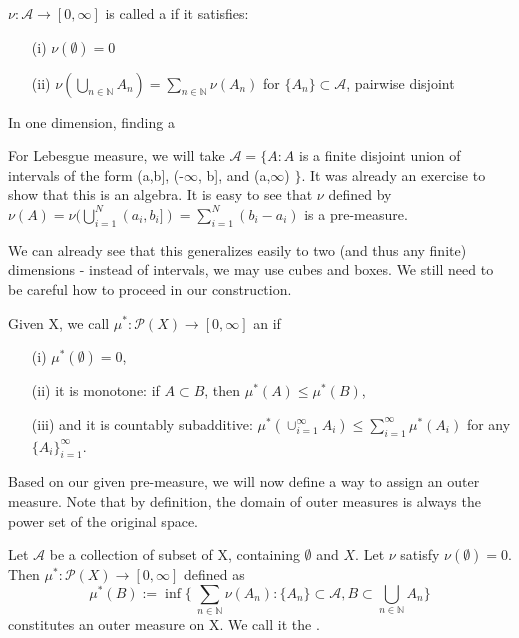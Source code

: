 \documentclass[11pt]{scrartcl}
\begin{document}
\begin{definition}
$\nu: \mathcal{A} \rightarrow [0,\infty]$ is called a  if it satisfies:
\begin{itemize}
\item[(i)] $\nu(\emptyset) = 0 $
\item[(ii)] $\nu(\bigcup_{n\in \mathbb{N}} A_n) = \sum_{n\in \mathbb{N}} \nu(A_n)$ for $\{A_n\}\subset \mathcal{A}$, pairwise disjoint 
\end{itemize}
\end{definition}

In one dimension, finding a 
\begin{example}
For Lebesgue measure, we will take $\mathcal{A} = \{A: A $ is a finite disjoint union of intervals of the form (a,b], (-$\infty$, b], and (a,$\infty$) $\}$. 
It was already an exercise to show that this is an algebra. It is easy to see that $\nu$ defined by $\nu(A) = \nu(\bigcup_{i=1}^N (a_i,b_i]) = \sum_{i=1}^N (b_i - a_i)$  is a pre-measure.
\end{example}

\begin{remark}
We can already see that this generalizes easily to two (and thus any finite) dimensions - instead of intervals, we may use cubes and boxes. We still need to be careful how to proceed in our construction.
\end{remark}

\begin{definition}
Given X, we call $\mu^*: \mathcal{P}(X) \rightarrow [0,\infty]$ an  if 
\begin{itemize}
\item[(i)] $\mu^*(\emptyset) = 0$,
\item[(ii)] it is monotone: if $ A \subset B$, then $\mu^*(A)\leq \mu^*(B)$,
\item[(iii)] and it is countably subadditive: $\mu^*(\cup_{i=1}^\infty A_i) \leq \sum_{i=1}^\infty \mu^*(A_i)$ for any $\{A_i\}_{i=1}^\infty$.
\end{itemize}
\end{definition}

Based on our given pre-measure, we will now define a way to assign an outer measure. Note that by definition, the domain of outer measures is always the power set of the original space.

\begin{theorem}
Let $\mathcal{A}$ be a collection of subset of X, containing $\emptyset$ and $X$. Let $\nu$ satisfy $\nu(\emptyset) = 0 $. Then $\mu^*: \mathcal{P}(X) \rightarrow [0,\infty]$ defined as 
$$\mu^*(B) := 
\inf \{\ \sum_{n \in \mathbb{N}} \nu(A_n) :  \{A_n\} \subset \mathcal{A}, B \subset \bigcup_{n\in \mathbb{N}} A_n  \}$$
constitutes an outer measure on X. We call it the .
\end{theorem}
\end{document}
